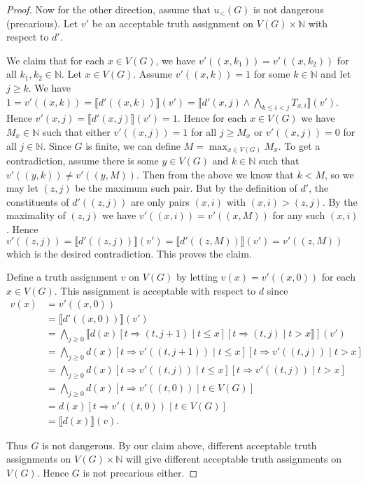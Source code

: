 \documentclass[12pt]{kluwer}
\theoremstyle{remark}
\begin{document}
\begin{proof}
Now for the other direction, assume that $u_{<}(G)$ is not dangerous (precarious). Let $v'$ be an acceptable truth assignment on $V(G) \times \mathbb{N}$ with respect to $d'$.

We claim that for each $x \in V(G)$, we have $v'((x, k_1)) = v'((x, k_2))$ for all $k_1, k_2 \in \mathbb{N}$.  Let $x \in V(G)$.  Assume $v'((x, k)) = 1$ for some $k \in \mathbb{N}$ and let $j \geq k$. We have $1 = v'((x,k)) = \llbracket d'((x,k))\rrbracket(v') = \llbracket d'(x, j) \wedge \bigwedge_{k \leq i < j} T_{x, i}\rrbracket(v')$.  Hence $v'(x, j) = \llbracket d'(x, j)\rrbracket(v') = 1$. Hence for each $x \in V(G)$ we have $M_x \in \mathbb{N}$ such that either $v'((x , j)) = 1$ for all $j \geq M_x$ or $v'((x, j)) = 0$ for all $j \in \mathbb{N}$.  Since $G$ is finite, we can define $M = \max_{x \in V(G)} M_x$.  To get a contradiction, assume there is some $y \in V(G)$ and $k \in \mathbb{N}$ such that $v'((y, k)) \neq v'((y, M))$.  Then from the above we know that $k < M$, so we may let $(z, j)$ be the maximum such pair.  But by the definition of $d'$, the constituents of $d'((z, j))$ are only pairs $(x, i)$ with $(x, i) > (z, j)$.  By the maximality of $(z, j)$ we have $v'((x, i)) = v'((x, M))$ for any such $(x, i)$.  Hence $v'((z, j)) = \llbracket d'((z, j)) \rrbracket (v') = \llbracket d'((z, M)) \rrbracket (v') = v'((z, M))$ which is the desired contradiction. This proves the claim.

Define a truth assignment $v$ on $V(G)$ by letting $v(x) = v'((x,0))$ for each $x \in V(G)$. This assignment is acceptable with respect to $d$ since
\begin{align*}
v(x) &= v'((x, 0)) \\
&= \llbracket d'((x, 0))\rrbracket (v') \\
&= \bigwedge_{j \geq 0} \llbracket d(x)[t \Rightarrow (t, j + 1) \mid t \leq x][t \Rightarrow (t, j) \mid t > x\rrbracket ](v') \\
&= \bigwedge_{j \geq 0} d(x)[t \Rightarrow v'((t, j + 1)) \mid t \leq x][t \Rightarrow v'((t, j)) \mid t > x] \\
&= \bigwedge_{j \geq 0} d(x)[t \Rightarrow v'((t, j)) \mid t \leq x][t \Rightarrow v'((t, j)) \mid t > x] \\
&= \bigwedge_{j \geq 0} d(x)[t \Rightarrow v'((t, 0)) \mid t \in V(G)] \\
&= d(x)[t \Rightarrow v'((t, 0)) \mid t \in V(G)] \\
&= \llbracket d(x)\rrbracket (v).
\end{align*}

Thus $G$ is not dangerous. By our claim above, different acceptable truth assignments on $V(G) \times \mathbb{N}$ will give different acceptable truth assignments on $V(G)$.  Hence $G$ is not precarious either.
\end{proof}
\end{document}
